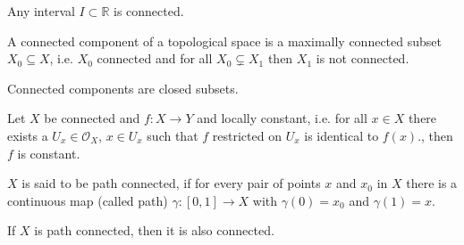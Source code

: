 \begin{thmbox}
    \begin{lemma}
        Any {\color{mathif}interval} \(I \subset \mathbb{R}\) is {\color{maththen}connected}.
    \end{lemma}
\end{thmbox}
%
\begin{defbox}
    \begin{definition}
        A connected component of a topological space is a maximally connected subset \(X_0 \subseteq X\), i.e. \(X_0\) connected and for all \(X_0 \subsetneq X_1\) then \(X_1\) is not connected.
    \end{definition}
\end{defbox}
%
\begin{thmbox}
    \begin{proposition}
        Connected components are closed subsets.
    \end{proposition}
\end{thmbox}
%
\begin{thmbox}
    \begin{lemma}[Lemma 11]
        Let \(X\) be connected and \(f: X \longrightarrow Y\) and locally constant, i.e. for all \(x \in X\) there exists a \(U_x \in \mathcal{O}_X\), \(x \in U_x\) such that \(f\) restricted on \(U_x\) is identical to \(f(x)\)., then \(f\) is constant.
    \end{lemma}
\end{thmbox}
%
\begin{defbox}
    \begin{definition}
        \(X\) is said to be {\color{maththen}path connected}, if for every pair of points \(x\) and \(x_0\) in \(X\) there is a continuous map (called path) \(\gamma: [0, 1] \longrightarrow X\) with \(\gamma(0) = x_0\) and \(\gamma(1) = x\).
    \end{definition}
\end{defbox}
%
\begin{thmbox}
    \begin{lemma}
        If \(X\) is path connected, then it is also connected.
    \end{lemma}
\end{thmbox}

